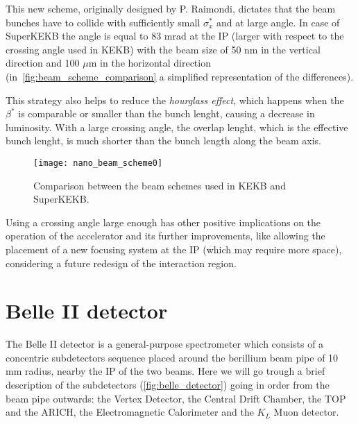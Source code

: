 This new scheme, originally designed by P. Raimondi\cite{Raimondi}, dictates that the beam bunches have to collide with sufficiently small $\sigma_{x}^{*}$ and at large angle. In case of SuperKEKB the angle is equal to 83 mrad at the IP (larger with respect to the crossing angle used in KEKB) with the beam size of 50 nm in the vertical direction and 100 $\mu$m in the horizontal direction (in~\autoref{fig:beam_scheme_comparison} a simplified representation of the differences).

This strategy also helps to reduce the \textit{hourglass effect}, which happens when the $\beta^{*}$ is comparable or smaller than the bunch lenght, causing a decrease in luminosity. With a large crossing angle, the overlap lenght, which is the effective bunch lenght, is much shorter than the bunch length along the beam axis. \\


\begin{figure}[h!]
\centering
\texttt{[image: nano\_beam\_scheme0]}
\caption{Comparison between the beam schemes used in KEKB and SuperKEKB.}
\label{fig:beam_scheme_comparison}
\end{figure}

Using a crossing angle large enough has other positive implications on the operation of the accelerator and its further improvements, like allowing the placement of a new focusing system at the IP (which may require more space), considering a future redesign of the interaction region.

\begin{comment}
In~\autoref{fig:beampar} are reported the main machine parameters (default value) of the SuperKEKB accelerator.

\begin{figure}[h!]
\centering
\texttt{[image: beam\_par]}
\caption{Machine parameters of SuperKEKB. The mark ''*'' indicate values in the IP.}
\label{fig:beampar}
\end{figure}
\end{comment}


\section{Belle II detector}


The Belle II detector is a general-purpose spectrometer which consists of a concentric subdetectors sequence placed around the berillium beam pipe of 10 mm radius, nearby the IP of the two beams. Here we will go trough a brief description of the subdetectors (\autoref{fig:belle_detector}) going in order from the beam pipe outwards: the Vertex Detector, the Central Drift Chamber, the TOP and the ARICH, the Electromagnetic Calorimeter and the $K_{L}$ Muon detector.\\

